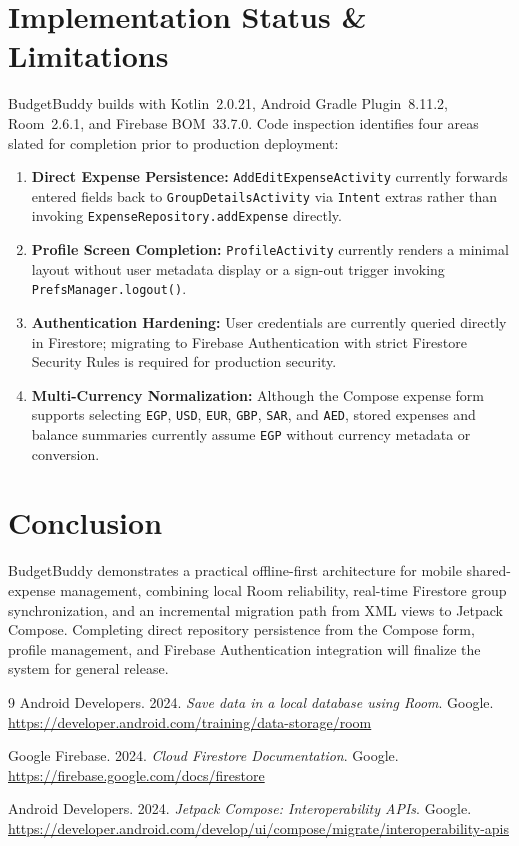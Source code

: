 \documentclass[sigconf,nonacm]{acmart}
\begin{document}
\section{Implementation Status \& Limitations}
BudgetBuddy builds with Kotlin~2.0.21, Android Gradle Plugin~8.11.2, Room~2.6.1, and Firebase BOM~33.7.0. Code inspection identifies four areas slated for completion prior to production deployment:
\begin{enumerate}
  \item \textbf{Direct Expense Persistence:} \texttt{AddEditExpenseActivity} currently forwards entered fields back to \texttt{GroupDetailsActivity} via \texttt{Intent} extras rather than invoking \texttt{ExpenseRepository.addExpense} directly.
  \item \textbf{Profile Screen Completion:} \texttt{ProfileActivity} currently renders a minimal layout without user metadata display or a sign-out trigger invoking \texttt{PrefsManager.logout()}.
  \item \textbf{Authentication Hardening:} User credentials are currently queried directly in Firestore; migrating to Firebase Authentication with strict Firestore Security Rules is required for production security.
  \item \textbf{Multi-Currency Normalization:} Although the Compose expense form supports selecting \texttt{EGP}, \texttt{USD}, \texttt{EUR}, \texttt{GBP}, \texttt{SAR}, and \texttt{AED}, stored expenses and balance summaries currently assume \texttt{EGP} without currency metadata or conversion.
\end{enumerate}

\section{Conclusion}
BudgetBuddy demonstrates a practical offline-first architecture for mobile shared-expense management, combining local Room reliability, real-time Firestore group synchronization, and an incremental migration path from XML views to Jetpack Compose. Completing direct repository persistence from the Compose form, profile management, and Firebase Authentication integration will finalize the system for general release.

\begin{thebibliography}{9}
Android Developers. 2024. \emph{Save data in a local database using Room}. Google. \url{https://developer.android.com/training/data-storage/room}

Google Firebase. 2024. \emph{Cloud Firestore Documentation}. Google. \url{https://firebase.google.com/docs/firestore}

Android Developers. 2024. \emph{Jetpack Compose: Interoperability APIs}. Google. \url{https://developer.android.com/develop/ui/compose/migrate/interoperability-apis}
\end{thebibliography}
\end{document}
